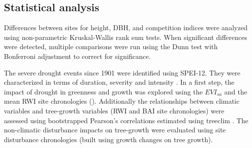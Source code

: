 \begin{table}
\caption{Characteristics of the mean tree-ring chronologies. Length values in parentheses indicate the number of years replicated with more than five series. \emph{RW} = mean annual ring width (standard deviation in parenthesis). MS = mean sensitivity. AR(1) = mean autocorrelation of raw series. Rbt = mean correlation between series. EPS = mean expressed population signal. EPS and Rbt were calculated for the mean residual chronologies of growth indices.}
\label{tab:dendro:chronologies}
\end{table}

\subsection{Statistical analysis}\label{sec:dendro:Stats}
Differences between sites for height, DBH, and competition indices were analyzed using non-parametric Kruskal-Wallis rank sum tests. When significant differences were detected, multiple comparisons were run using the Dunn test with Bonferroni adjustment to correct for significance.

The severe drought events since 1901 were identified using SPEI-12. They were characterized in terms of duration, severity and intensity \autocite[see][]{Spinonietal2015EuropeanDrought}. In a first step, the impact of drought in greenness and growth was explored using the \(EVI_{sa}\) and the mean RWI site chronologies (). Additionally the relationships between climatic variables and tree-growth variables (RWI and BAI site chronologies) were assessed using bootstrapped Pearson's correlations estimated using treeclim \autocite{ZangBiondi2015TreeclimPackage}. The non-climatic disturbance impacts on tree-growth were evaluated using site disturbance chronologies (built using growth changes on tree growth).

